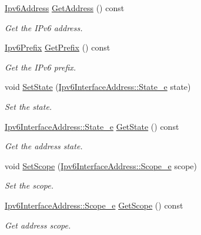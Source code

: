 \begin{DoxyCompactItemize}
\hyperlink{classns3_1_1Ipv6Address}{Ipv6\+Address} \hyperlink{classns3_1_1Ipv6InterfaceAddress_a80d4caacff72bddc3045a5929519e107}{Get\+Address} () const 
\begin{DoxyCompactList}\small\item\em Get the I\+Pv6 address. \end{DoxyCompactList}\item 
\hyperlink{classns3_1_1Ipv6Prefix}{Ipv6\+Prefix} \hyperlink{classns3_1_1Ipv6InterfaceAddress_a6dd2dc3ca680740939cfc736420a1232}{Get\+Prefix} () const 
\begin{DoxyCompactList}\small\item\em Get the I\+Pv6 prefix. \end{DoxyCompactList}\item 
void \hyperlink{classns3_1_1Ipv6InterfaceAddress_a3ca257cb4c203c6cc7fe03f2b4503179}{Set\+State} (\hyperlink{classns3_1_1Ipv6InterfaceAddress_aa01e95b0e78bf3f0200a98f6bfe64f07}{Ipv6\+Interface\+Address\+::\+State\+\_\+e} state)
\begin{DoxyCompactList}\small\item\em Set the state. \end{DoxyCompactList}\item 
\hyperlink{classns3_1_1Ipv6InterfaceAddress_aa01e95b0e78bf3f0200a98f6bfe64f07}{Ipv6\+Interface\+Address\+::\+State\+\_\+e} \hyperlink{classns3_1_1Ipv6InterfaceAddress_ae79f8a96c3e44de4ee7f0d41f1d13ac7}{Get\+State} () const 
\begin{DoxyCompactList}\small\item\em Get the address state. \end{DoxyCompactList}\item 
void \hyperlink{classns3_1_1Ipv6InterfaceAddress_a052449499efd097a40b436995c815cc0}{Set\+Scope} (\hyperlink{classns3_1_1Ipv6InterfaceAddress_ad3f03debf9dae475b81ea9cdf81f4f27}{Ipv6\+Interface\+Address\+::\+Scope\+\_\+e} scope)
\begin{DoxyCompactList}\small\item\em Set the scope. \end{DoxyCompactList}\item 
\hyperlink{classns3_1_1Ipv6InterfaceAddress_ad3f03debf9dae475b81ea9cdf81f4f27}{Ipv6\+Interface\+Address\+::\+Scope\+\_\+e} \hyperlink{classns3_1_1Ipv6InterfaceAddress_a514900e73eaab49a5b3c9962fa4eefde}{Get\+Scope} () const 
\begin{DoxyCompactList}\small\item\em Get address scope. \end{DoxyCompactList}\item 

\end{DoxyCompactItemize}
